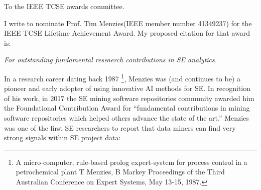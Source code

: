 \documentclass[10pt]{article}
\begin{document}
To the IEEE TCSE awards committee.

I write to nominate Prof. Tim Menzies(IEEE member number 41349237) for the IEEE TCSE Lifetime Achievement  Award. 
My proposed citation for that award is:

\begin{mdframed}[hidealllines=true,backgroundcolor=blue!10]
\begin{center}
{\em For outstanding fundamental reseaerch contributions in SE analytics.}
\end{center}
\end{mdframed}

In a research career dating back 1987 \footnote{A micro-computer, rule-based prolog 
expert-system for process control in a petrochemical plant
T Menzies, B Markey
Proceedings of the Third Australian Conference on Expert Systems, May 13-15, 1987.},
Menzies was (and continues to be) a pioneer and early adopter of using innovative AI methods for SE. In recognition of his work, in 2017 the SE mining software repositories community awarded him the Foundational Contribution Award for “fundamental contributions in mining software repositories which helped others advance the state of the art.” 
Menzies was one of the first SE researchers to report that data miners can find very strong signals within SE project data:
\end{document}
